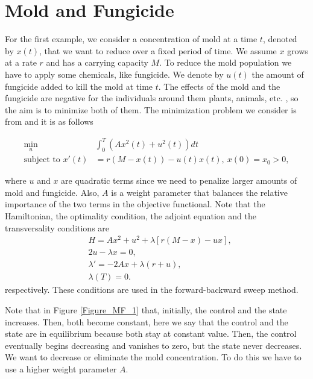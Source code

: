 \section{Mold and Fungicide} %
    For the first example, we consider a concentration of mold at a time $t$,
    denoted by $x(t)$, that we want to reduce over a fixed period of time. We
    assume $x$ grows at a rate $r$ and has a carrying capacity $M$. To reduce
    the mold population we have to apply some chemicals, like fungicide. We
    denote by $u(t)$ the amount of fungicide added to kill the mold at time $t$.
    The effects of the mold and the fungicide are negative for the individuals
    around them \textemdash plants, animals, etc. \textemdash, so the aim is to
    minimize both of them. The minimization problem we consider is from
    \citep{lenhart2007optimal} and it is as follows
    
    \begin{align*}
    	\min_{u} &\int_{0}^{T} (Ax^2(t) + u^2(t))dt \\
        \text{subject to } x'(t) &= r(M - x(t)) - u(t)x(t), \ x(0) = x_0 > 0,
    \end{align*}
    
    \noindent where $u$ and $x$ are quadratic terms since we need to penalize larger amounts 
    of mold and fungicide. Also, $A$ is a weight parameter that 
    balances the relative importance of the two terms in the objective functional. 
    Note that the Hamiltonian, the optimality condition, the adjoint equation and the transversality 
    conditions are
    \begin{align*}
        &H = Ax^2 + u^2 + \lambda [r(M-x) - ux], \\
        &2u - \lambda x = 0, \\
        &\lambda ' = -2Ax + \lambda(r + u), \\
        &\lambda(T) = 0.
    \end{align*}
    respectively. These conditions are used in the forward-backward sweep method.
        
    \noindent Note that in Figure \ref{Figure_MF_1} that, initially, the 
    control and the state increases. Then, both become constant, here we 
    say that the control and the state are in equilibrium because both stay 
    at constant value. Then, the control eventually begins decreasing and
    vanishes to zero, but the state never decreases. We want to decrease or
    eliminate the mold concentration. To do this we have to use a higher 
    weight parameter $A$.
    
